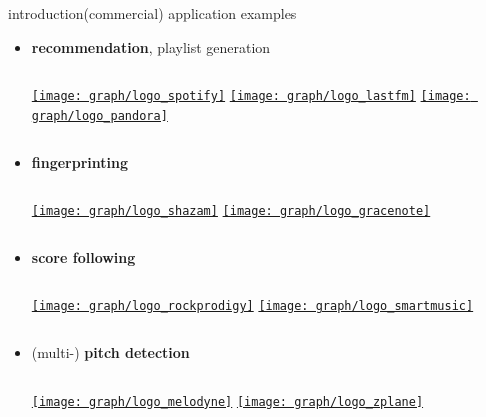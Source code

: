         \begin{frame}{introduction}{(commercial) application examples}
            \begin{itemize}
                \item   \textbf{recommendation}, playlist generation
                    \begin{columns}
                            \href{https://www.spotify.com}{\texttt{[image: graph/logo\_spotify]}}
                            \href{https://www.last.fm}{\texttt{[image: graph/logo\_lastfm]}}
                            \href{https://www.pandora.com}{\texttt{[image: graph/logo\_pandora]}}
                    \end{columns}
                \bigskip
                \item<1->   \textbf{fingerprinting} 
                    \begin{columns}
                            \href{https://www.shazam.com}{\texttt{[image: graph/logo\_shazam]}}
                            \href{https://www.gracenote.com}{\texttt{[image: graph/logo\_gracenote]}}
                    \end{columns}
                \bigskip
                \item<1->   \textbf{score following} 
                   \begin{columns}
                            \href{http://www.rockprodigy.com}{\texttt{[image: graph/logo\_rockprodigy]}}
                            \href{https://www.smartmusic.com}{\texttt{[image: graph/logo\_smartmusic]}}
                    \end{columns}
                \bigskip
                \item<1->   (multi-) \textbf{pitch detection} 
                    \begin{columns}
                            \href{http://www.celemony.com}{\texttt{[image: graph/logo\_melodyne]}}
                            \href{http://www.zplane.de}{\texttt{[image: graph/logo\_zplane]}}
                    \end{columns}
            \end{itemize}
        \end{frame}


